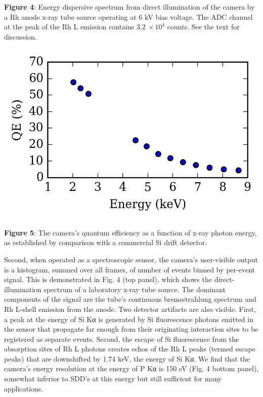 \textbf{Figure 4}: Energy dispersive spectrum from direct illumination
of the camera by a Rh anode x-ray tube source operating at 6 kV bias
voltage. The ADC channel at the peak of the Rh L emission contains
\(3.2\  \times 10^{4}\) counts. See the text for discussion.
\bigbreak

\begin{center}
\includegraphics{NewCameraPaper_1.10.docx1502867018/media/image5.png}
\end{center}

\textbf{Figure 5}: The camera's quantum efficiency as a function of
x-ray photon energy, as established by comparison with a commercial Si
drift detector.
\bigbreak


Second, when operated as a spectroscopic sensor, the camera's
user-visible output is a histogram, summed over all frames, of number of
events binned by per-event signal. This is demonstrated in Fig. 4 (top
panel), which shows the direct-illumination spectrum of a laboratory
x-ray tube source. The dominant components of the signal are the tube's
continuous bremsstrahlung spectrum and Rh L-shell emission from the
anode. Two detector artifacts are also visible. First, a peak at the
energy of Si Kα is generated by Si fluorescence photons emitted in the
sensor that propagate far enough from their originating interaction
sites to be registered as separate events. Second, the escape of Si
fluorescence from the absorption sites of Rh L photons creates echos of
the Rh L peaks (termed escape peaks) that are downshifted by 1.74 keV,
the energy of Si Kα. We find that the camera's energy resolution at the
energy of P Kα is 150 eV (Fig. 4 bottom panel), somewhat inferior to
SDD's at this energy but still sufficient for many applications.

